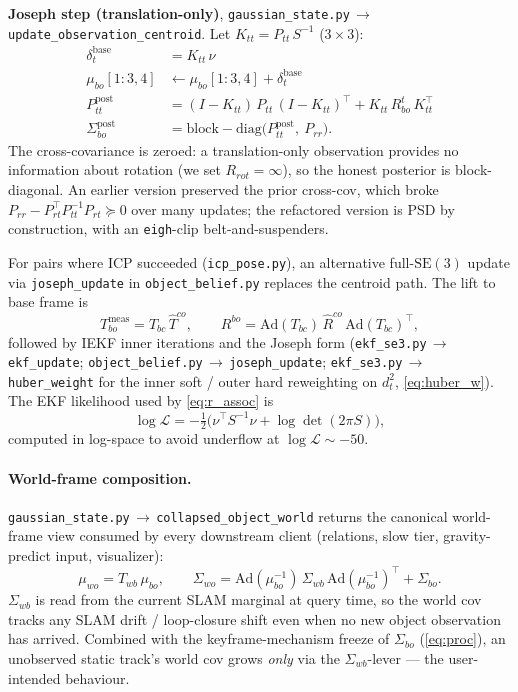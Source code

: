 \documentclass[11pt]{article}
\newcommand{\SE}{\mathrm{SE}(3)}
\newcommand{\Ad}{\mathrm{Ad}}
\newcommand{\file}[1]{\texttt{#1}}
\begin{document}
\textbf{Joseph step (translation-only)}, \file{gaussian\_state.py}\,$\to$
\texttt{update\_observation\_centroid}. Let $K_{tt} = P_{tt}\,S^{-1}$ ($3\times 3$):
\begin{align*}
  \delta_t^{\text{base}} &= K_{tt}\,\nu \\
  \mu_{bo}[1{:}3, 4] &\leftarrow \mu_{bo}[1{:}3, 4] + \delta_t^{\text{base}} \\
  P_{tt}^{\text{post}} &= (I - K_{tt})\,P_{tt}\,(I - K_{tt})^\top + K_{tt}\,R_{bo}^t\,K_{tt}^\top \\
  \Sigma_{bo}^{\text{post}} &= \mathrm{block\!-\!diag}\bigl(P_{tt}^{\text{post}},\ P_{rr}\bigr).
\end{align*}
The cross-covariance is zeroed: a translation-only observation
provides no information about rotation (we set $R_{rot}=\infty$),
so the honest posterior is block-diagonal. An earlier version
preserved the prior cross-cov, which broke
$P_{rr}-P_{rt}^\top P_{tt}^{-1}P_{rt}\succeq 0$ over many updates;
the refactored version is PSD by construction, with an
\texttt{eigh}-clip belt-and-suspenders.

For pairs where ICP succeeded (\file{icp\_pose.py}), an alternative
full-$\SE$ update via \texttt{joseph\_update} in
\file{object\_belief.py} replaces the centroid path. The lift to base
frame is
\begin{equation}\label{eq:meas_compose}
T_{bo}^{\text{meas}} = T_{bc}\,\hat T^{co}, \qquad
R^{bo} = \Ad(T_{bc})\,\hat R^{co}\,\Ad(T_{bc})^\top,
\end{equation}
followed by IEKF inner iterations and the Joseph form
(\file{ekf\_se3.py}\,$\to$\,\texttt{ekf\_update};
\file{object\_belief.py}\,$\to$\,\texttt{joseph\_update};
\file{ekf\_se3.py}\,$\to$\,\texttt{huber\_weight} for the
inner soft / outer hard reweighting on $d^2_t$, \eqref{eq:huber_w}). The
EKF likelihood used by \eqref{eq:r_assoc} is
\begin{equation}\label{eq:ekf_lik}
\log\mathcal L = -\tfrac{1}{2}\bigl(\nu^\top S^{-1}\nu + \log\det(2\pi S)\bigr),
\end{equation}
computed in log-space to avoid underflow at $\log\mathcal L\sim -50$.

\paragraph{World-frame composition.}\label{sec:world_compose}
\file{gaussian\_state.py}\,$\to$\,\texttt{collapsed\_object\_world}
returns the canonical world-frame view consumed by every downstream
client (relations, slow tier, gravity-predict input, visualizer):
\begin{equation}\label{eq:world_compose}
\mu_{wo} = T_{wb}\,\mu_{bo}, \qquad
\Sigma_{wo} = \Ad(\mu_{bo}^{-1})\,\Sigma_{wb}\,\Ad(\mu_{bo}^{-1})^\top
              + \Sigma_{bo}.
\end{equation}
$\Sigma_{wb}$ is read from the current SLAM marginal at query time, so
the world cov tracks any SLAM drift / loop-closure shift even when no
new object observation has arrived. Combined with the
keyframe-mechanism freeze of $\Sigma_{bo}$ (\eqref{eq:proc}), an
unobserved static track's world cov grows \emph{only} via the
$\Sigma_{wb}$-lever — the user-intended behaviour.
\end{document}
